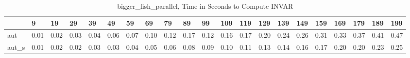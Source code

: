 \begin{table}
\caption{bigger_fish_parallel, Time in Seconds to Compute INVAR}
\label{bigger_fish_parallel_INVAR_time}
\begin{tabular}{lllllllllllllllllllll}
\toprule
 & 9 & 19 & 29 & 39 & 49 & 59 & 69 & 79 & 89 & 99 & 109 & 119 & 129 & 139 & 149 & 159 & 169 & 179 & 189 & 199 \\
\midrule
aut & 0.01 & 0.02 & 0.03 & 0.04 & 0.06 & 0.07 & 0.10 & 0.12 & 0.17 & 0.12 & 0.16 & 0.17 & 0.20 & 0.24 & 0.26 & 0.31 & 0.33 & 0.37 & 0.41 & 0.47 \\
aut_s & 0.01 & 0.02 & 0.02 & 0.03 & 0.03 & 0.04 & 0.05 & 0.06 & 0.08 & 0.09 & 0.10 & 0.11 & 0.13 & 0.14 & 0.16 & 0.17 & 0.20 & 0.20 & 0.23 & 0.25 \\
\bottomrule
\end{tabular}
\end{table}
